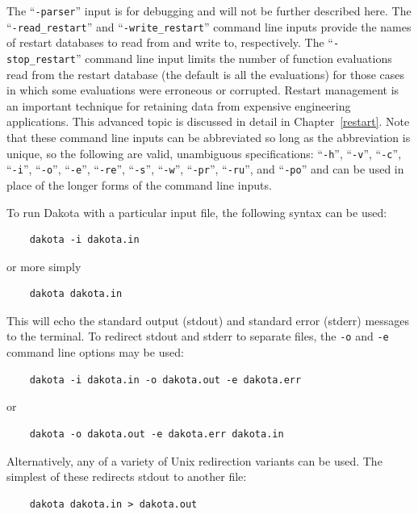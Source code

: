 The ``\texttt{-parser}'' input
is for debugging and will not be further described here. The
``\texttt{-read\_restart}'' and ``\texttt{-write\_restart}'' command
line inputs provide the names of restart databases to read from and
write to, respectively. The ``\texttt{-stop\_restart}'' command line
input limits the number of function evaluations read from the restart
database (the default is all the evaluations) for those cases in which
some evaluations were erroneous or corrupted. Restart management is an
important technique for retaining data from expensive engineering
applications. This advanced topic is discussed in detail in
Chapter~\ref{restart}. Note that these command line inputs can be
abbreviated so long as the abbreviation is unique, so the following
are valid, unambiguous specifications: ``\texttt{-h}'',
``\texttt{-v}'', ``\texttt{-c}'', ``\texttt{-i}'', ``\texttt{-o}'',
``\texttt{-e}'', ``\texttt{-re}'', ``\texttt{-s}'', ``\texttt{-w}'',
``\texttt{-pr}'', ``\texttt{-ru}'', and ``\texttt{-po}'' and can be
used in place of the longer forms of the command line inputs.

To run Dakota with a particular input file, the following syntax can
be used:
\begin{small}
\begin{verbatim}
    dakota -i dakota.in
\end{verbatim}
\end{small}
or more simply
\begin{small}
\begin{verbatim}
    dakota dakota.in
\end{verbatim}
\end{small}

This will echo the standard output (stdout) and standard error
(stderr) messages to the terminal. To redirect stdout and stderr to
separate files, the \texttt{-o} and \texttt{-e} command line options
may be used:
\begin{small}
\begin{verbatim}
    dakota -i dakota.in -o dakota.out -e dakota.err
\end{verbatim}
\end{small}
or
\begin{small}
\begin{verbatim}
    dakota -o dakota.out -e dakota.err dakota.in
\end{verbatim}
\end{small}

Alternatively, any of a variety of Unix redirection variants can be
used. The simplest of these redirects stdout to another file:
\begin{small}
\begin{verbatim}
    dakota dakota.in > dakota.out
\end{verbatim}
\end{small}


